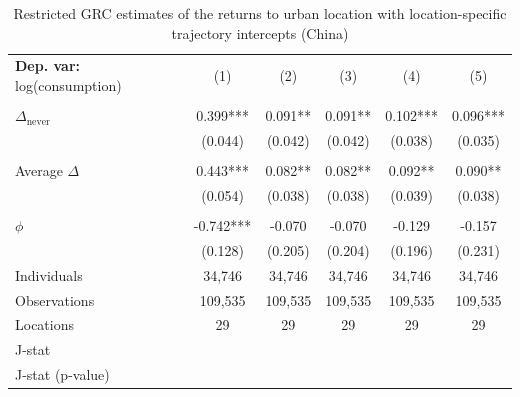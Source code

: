 \begin{table}[htbp] \centering \begin{threeparttable}
 \caption{Restricted GRC estimates of the returns to urban location with location-specific trajectory intercepts (China)} 
 \label{tab:verdier_robust_onestep_CHN_consumption_urban_unb} 
\begin{tabular}{l ccccc} \toprule  \textbf{Dep. var:}  log(consumption) 
                    &\multicolumn{1}{c}{(1)}   &\multicolumn{1}{c}{(2)}   &\multicolumn{1}{c}{(3)}   &\multicolumn{1}{c}{(4)}   &\multicolumn{1}{c}{(5)}   \\
                    &               &               &               &               &               \\
\addlinespace
$\Delta_{\text{never}}$&       0.399***&       0.091** &       0.091** &       0.102***&       0.096***\\
                    &     (0.044)   &     (0.042)   &     (0.042)   &     (0.038)   &     (0.035)   \\
                    &               &               &               &               &               \\
\addlinespace
Average $\Delta$    &       0.443***&       0.082** &       0.082** &       0.092** &       0.090** \\
                    &     (0.054)   &     (0.038)   &     (0.038)   &     (0.039)   &     (0.038)   \\
                    &               &               &               &               &               \\
\addlinespace
$\phi$              &      -0.742***&      -0.070   &      -0.070   &      -0.129   &      -0.157   \\
                    &     (0.128)   &     (0.205)   &     (0.204)   &     (0.196)   &     (0.231)   \\
\addlinespace
Individuals         &      34,746   &      34,746   &      34,746   &      34,746   &      34,746   \\
Observations        &     109,535   &     109,535   &     109,535   &     109,535   &     109,535   \\
Locations           &          29   &          29   &          29   &          29   &          29   \\
J-stat              &               &               &               &               &               \\
J-stat (p-value)    &               &               &               &               &               \\

\end{tabular}
\end{threeparttable}
\end{table}
